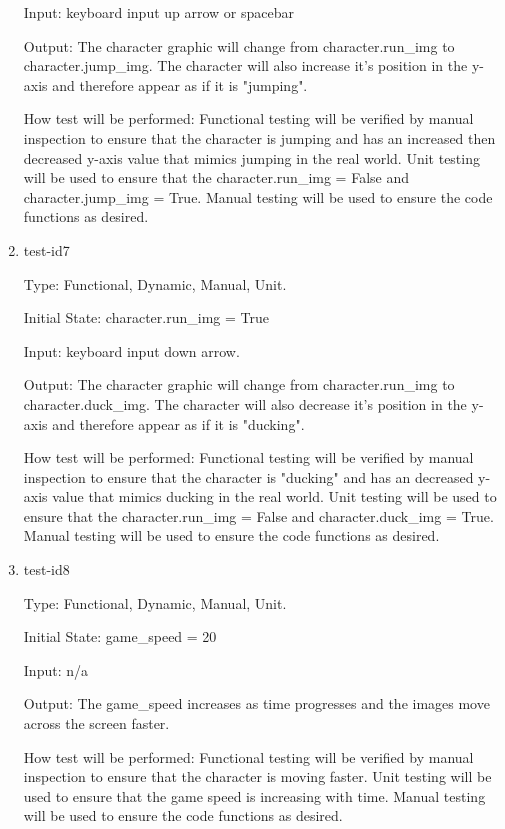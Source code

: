\documentclass[12pt, titlepage]{article}
\begin{document}
\begin{enumerate}
		Input: keyboard input up arrow or spacebar
		
		Output: The character graphic will change from character.run\_img to character.jump\_img. The character will also increase it's position in the y-axis and therefore appear as if it is "jumping". 
		
		How test will be performed: Functional testing will be verified by manual inspection to ensure that the character is jumping and has an increased then decreased y-axis value that mimics jumping in the real world. Unit testing will be used to ensure that the character.run\_img = False and character.jump\_img = True. Manual testing will be used to ensure the code functions as desired. 
		
		\item{test-id7\\}
		
		Type: Functional, Dynamic, Manual, Unit.
		
		Initial State: character.run\_img = True
		
		Input: keyboard input down arrow. 
		
		Output: The character graphic will change from character.run\_img to character.duck\_img. The character will also decrease it's position in the y-axis and therefore appear as if it is "ducking". 
		
		How test will be performed: Functional testing will be verified by manual inspection to ensure that the character is "ducking" and has an decreased y-axis value that mimics ducking in the real world. Unit testing will be used to ensure that the character.run\_img = False and character.duck\_img = True. Manual testing will be used to ensure the code functions as desired. 
		
		\item{test-id8\\}
		
		Type: Functional, Dynamic, Manual, Unit.
		
		Initial State: game\_speed = 20
		
		Input: n/a
		
		Output: The game\_speed increases as time progresses and the images move across the screen faster. 
		
		How test will be performed: Functional testing will be verified by manual inspection to ensure that the character is moving faster. Unit testing will be used to ensure that the game speed is increasing with time. Manual testing will be used to ensure the code functions as desired. 
		
	\end{enumerate}
	
\end{document}
